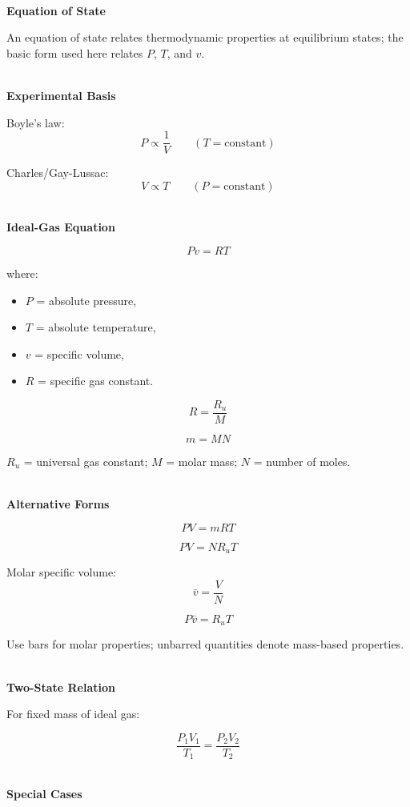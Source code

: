 \documentclass[12pt]{article}
\begin{document}
\textbf{\\ Equation of State}

An equation of state relates thermodynamic properties at equilibrium states; the basic form used here relates $P$, $T$, and $v$.

\textbf{\\ Experimental Basis}

Boyle's law:
\[
\boxed{P\propto\frac{1}{V}}
\qquad
(T=\text{constant})
\]

Charles/Gay-Lussac:
\[
\boxed{V\propto T}
\qquad
(P=\text{constant})
\]

\textbf{\\ Ideal-Gas Equation}

\[
\boxed{Pv=RT}
\]

where:
\begin{itemize}[leftmargin=*]
    \item $P$ = absolute pressure,
    \item $T$ = absolute temperature,
    \item $v$ = specific volume,
    \item $R$ = specific gas constant.
\end{itemize}

\[
\boxed{R=\frac{R_u}{M}}
\]

\[
\boxed{m=MN}
\]

$R_u$ = universal gas constant; $M$ = molar mass; $N$ = number of moles.

\textbf{\\ Alternative Forms}

\[
\boxed{PV=mRT}
\]

\[
\boxed{PV=NR_uT}
\]

Molar specific volume:
\[
\boxed{\bar v=\frac{V}{N}}
\]

\[
\boxed{P\bar v=R_uT}
\]

Use bars for molar properties; unbarred quantities denote mass-based properties.

\textbf{\\ Two-State Relation}

For fixed mass of ideal gas:

\[
\boxed{
\frac{P_1V_1}{T_1}
=
\frac{P_2V_2}{T_2}
}
\]

\textbf{\\ Special Cases}
\end{document}
